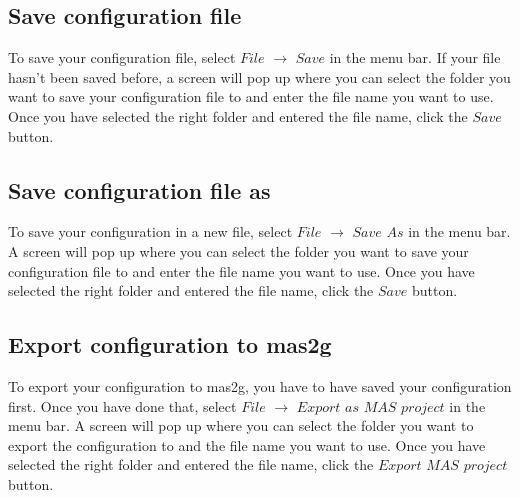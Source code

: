 \documentclass[a4paper]{article}
\begin{document}
\subsection{Save configuration file}
To save your configuration file, select $File$ $\to$ $Save$ in the menu bar. If your file hasn't been saved before, a screen will pop up where you can select the folder you want to save your configuration file to and enter the file name you want to use. Once you have selected the right folder and entered the file name, click the $Save$ button.

\subsection{Save configuration file as}
To save your configuration in a new file, select $File$ $\to$ $Save$ $As$ in the menu bar. A screen will pop up where you can select the folder you want to save your configuration file to and enter the file name you want to use. Once you have selected the right folder and entered the file name, click the $Save$ button.

\subsection{Export configuration to mas2g}
To export your configuration to mas2g, you have to have saved your configuration first. Once you have done that, select $File$ $\to$ $Export$ $as$ $MAS$ $project$ in the menu bar. A screen will pop up where you can select the folder you want to export the configuration to and the file name you want to use. Once you have selected the right folder and entered the file name, click the $Export$ $MAS$ $project$ button.
\end{document}
